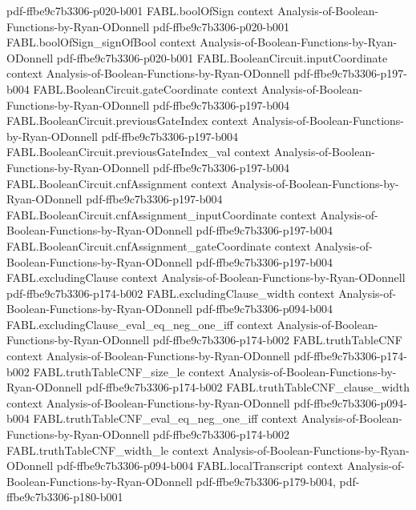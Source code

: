 \begin{theorem}
  {pdf-ffbe9c7b3306-p020-b001}
\proofstep
  {FABL.boolOfSign}
  {context}
  {Analysis-of-Boolean-Functions-by-Ryan-ODonnell}
  {pdf-ffbe9c7b3306-p020-b001}
\proofstep
  {FABL.boolOfSign_signOfBool}
  {context}
  {Analysis-of-Boolean-Functions-by-Ryan-ODonnell}
  {pdf-ffbe9c7b3306-p020-b001}
\proofstep
  {FABL.BooleanCircuit.inputCoordinate}
  {context}
  {Analysis-of-Boolean-Functions-by-Ryan-ODonnell}
  {pdf-ffbe9c7b3306-p197-b004}
\proofstep
  {FABL.BooleanCircuit.gateCoordinate}
  {context}
  {Analysis-of-Boolean-Functions-by-Ryan-ODonnell}
  {pdf-ffbe9c7b3306-p197-b004}
\proofstep
  {FABL.BooleanCircuit.previousGateIndex}
  {context}
  {Analysis-of-Boolean-Functions-by-Ryan-ODonnell}
  {pdf-ffbe9c7b3306-p197-b004}
\proofstep
  {FABL.BooleanCircuit.previousGateIndex_val}
  {context}
  {Analysis-of-Boolean-Functions-by-Ryan-ODonnell}
  {pdf-ffbe9c7b3306-p197-b004}
\proofstep
  {FABL.BooleanCircuit.cnfAssignment}
  {context}
  {Analysis-of-Boolean-Functions-by-Ryan-ODonnell}
  {pdf-ffbe9c7b3306-p197-b004}
\proofstep
  {FABL.BooleanCircuit.cnfAssignment_inputCoordinate}
  {context}
  {Analysis-of-Boolean-Functions-by-Ryan-ODonnell}
  {pdf-ffbe9c7b3306-p197-b004}
\proofstep
  {FABL.BooleanCircuit.cnfAssignment_gateCoordinate}
  {context}
  {Analysis-of-Boolean-Functions-by-Ryan-ODonnell}
  {pdf-ffbe9c7b3306-p197-b004}
\proofstep
  {FABL.excludingClause}
  {context}
  {Analysis-of-Boolean-Functions-by-Ryan-ODonnell}
  {pdf-ffbe9c7b3306-p174-b002}
\proofstep
  {FABL.excludingClause_width}
  {context}
  {Analysis-of-Boolean-Functions-by-Ryan-ODonnell}
  {pdf-ffbe9c7b3306-p094-b004}
\proofstep
  {FABL.excludingClause_eval_eq_neg_one_iff}
  {context}
  {Analysis-of-Boolean-Functions-by-Ryan-ODonnell}
  {pdf-ffbe9c7b3306-p174-b002}
\proofstep
  {FABL.truthTableCNF}
  {context}
  {Analysis-of-Boolean-Functions-by-Ryan-ODonnell}
  {pdf-ffbe9c7b3306-p174-b002}
\proofstep
  {FABL.truthTableCNF_size_le}
  {context}
  {Analysis-of-Boolean-Functions-by-Ryan-ODonnell}
  {pdf-ffbe9c7b3306-p174-b002}
\proofstep
  {FABL.truthTableCNF_clause_width}
  {context}
  {Analysis-of-Boolean-Functions-by-Ryan-ODonnell}
  {pdf-ffbe9c7b3306-p094-b004}
\proofstep
  {FABL.truthTableCNF_eval_eq_neg_one_iff}
  {context}
  {Analysis-of-Boolean-Functions-by-Ryan-ODonnell}
  {pdf-ffbe9c7b3306-p174-b002}
\proofstep
  {FABL.truthTableCNF_width_le}
  {context}
  {Analysis-of-Boolean-Functions-by-Ryan-ODonnell}
  {pdf-ffbe9c7b3306-p094-b004}
\proofstep
  {FABL.localTranscript}
  {context}
  {Analysis-of-Boolean-Functions-by-Ryan-ODonnell}
  {pdf-ffbe9c7b3306-p179-b004,
    pdf-ffbe9c7b3306-p180-b001}

\end{theorem}
